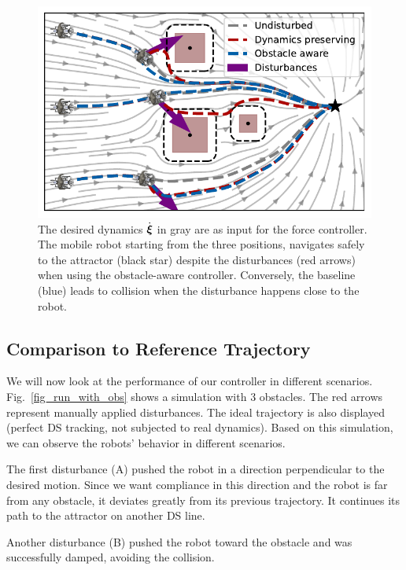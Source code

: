 \begin{figure}
  \centering
  \centerline{\includegraphics[width=0.95\columnwidth]{figures/multi_obstacle_with_damping.pdf}}
  \caption{The desired dynamics $\dot{\boldsymbol{\xi}}$ in gray are as input for the force controller. 
  The mobile robot starting from the three positions, navigates safely to the attractor (black star) despite the disturbances (red arrows) when using the obstacle-aware controller.
  Conversely, the baseline (blue) leads to collision when the disturbance happens close to the robot.}
  \label{fig:obstacle_aware_damping_comparison}
\end{figure}

\subsection{Comparison to Reference Trajectory}
We will now look at the performance of our controller in different scenarios. Fig.~\ref{fig_run_with_obs} shows a simulation with 3 obstacles. The red arrows represent manually applied disturbances. The ideal trajectory is also displayed (perfect DS tracking, not subjected to real dynamics). Based on this simulation, we can observe the robots' behavior in different scenarios.

The first disturbance (A) pushed the robot in a direction perpendicular to the desired motion. Since we want compliance in this direction and the robot is far from any obstacle, it deviates greatly from its previous trajectory. It continues its path to the attractor on another DS line.

Another disturbance (B) pushed the robot toward the obstacle and was successfully damped, avoiding the collision.

